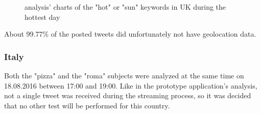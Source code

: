 \documentclass[a4paper,11pt]{report}
\begin{document}
\begin{figure}[H]
\vspace{-5pt}
\begin{center}
\vspace{-5pt}
\caption{analysis' charts of the "hot" or "sun" keywords in UK during the hottest day}
\end{center}
\end{figure}
\vspace{-10pt}

About 99.77\% of the posted tweets did unfortunately not have geolocation data.


\subsubsection{Italy}
Both the "pizza" and the "roma" subjects were analyzed at the same time on 18.08.2016 between 17:00 and 19:00. Like in the prototype application's analysis, not a single tweet was received during the streaming process, so it was decided that no other test will be performed for this country.
\bigskip
\end{document}
